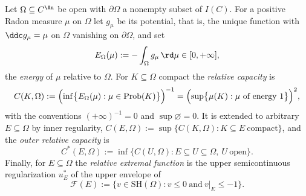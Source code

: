 \begin{definition}
\label{def:ch25-thuillier-capacity}
Let $\Omega\subseteq C^{\An}$ be open with $\partial\Omega$ a nonempty
subset of $I(C)$.  For a positive Radon measure $\mu$ on $\Omega$ let
$g_\mu$ be its potential, that is, the unique function with
$\ddc g_\mu=\mu$ on $\Omega$ vanishing on $\partial\Omega$, and set
\[
 E_\Omega(\mu):=-\int_\Omega g_\mu\,\rd\mu\in[0,+\infty] ,
\]
the \emph{energy} of $\mu$ relative to $\Omega$.  For $K\subseteq\Omega$
compact the \emph{relative capacity} is
\begin{equation}
\label{eq:ch25-thuillier-capacity}
 C(K,\Omega):=\Bigl(\inf\bigl\{E_\Omega(\mu):
   \mu\in\operatorname{Prob}(K)\bigr\}\Bigr)^{-1}
 =\Bigl(\sup\bigl\{\mu(K):\mu\ \text{of energy}\ 1\bigr\}\Bigr)^{2},
\end{equation}
with the conventions $(+\infty)^{-1}=0$ and $\sup\varnothing=0$.  It is
extended to arbitrary $E\subseteq\Omega$ by inner regularity,
$C(E,\Omega):=\sup\{C(K,\Omega):K\subseteq E\ \text{compact}\}$, and the
\emph{outer relative capacity} is
\begin{equation}
\label{eq:ch25-thuillier-outer}
 C^*(E,\Omega):=\inf\bigl\{C(U,\Omega):
    E\subseteq U\subseteq\Omega,\ U\ \text{open}\bigr\}.
\end{equation}
Finally, for $E\subseteq\Omega$ the \emph{relative extremal function} is
the upper semicontinuous regularization $u^*_E$ of the upper envelope of
\[
 \mathcal F(E):=\bigl\{v\in\mathrm{SH}(\Omega):v\leq0\ \text{and}\
    v|_E\leq-1\bigr\}.
\]
\end{definition}

